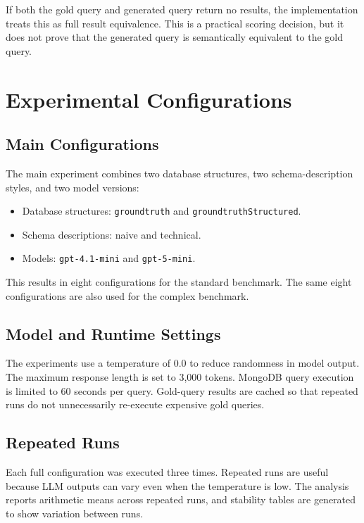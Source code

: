 If both the gold query and generated query return no results, the implementation treats this as full result equivalence. This is a practical scoring decision, but it does not prove that the generated query is semantically equivalent to the gold query.

\section{Experimental Configurations}

\subsection{Main Configurations}

The main experiment combines two database structures, two schema-description styles, and two model versions:

\begin{itemize}
    \item Database structures: \texttt{groundtruth} and \texttt{groundtruthStructured}.
    \item Schema descriptions: naive and technical.
    \item Models: \texttt{gpt-4.1-mini} and \texttt{gpt-5-mini}.
\end{itemize}

This results in eight configurations for the standard benchmark. The same eight configurations are also used for the complex benchmark.

\subsection{Model and Runtime Settings}

The experiments use a temperature of 0.0 to reduce randomness in model output. The maximum response length is set to 3,000 tokens. MongoDB query execution is limited to 60 seconds per query. Gold-query results are cached so that repeated runs do not unnecessarily re-execute expensive gold queries.

\subsection{Repeated Runs}

Each full configuration was executed three times. Repeated runs are useful because LLM outputs can vary even when the temperature is low. The analysis reports arithmetic means across repeated runs, and stability tables are generated to show variation between runs.

